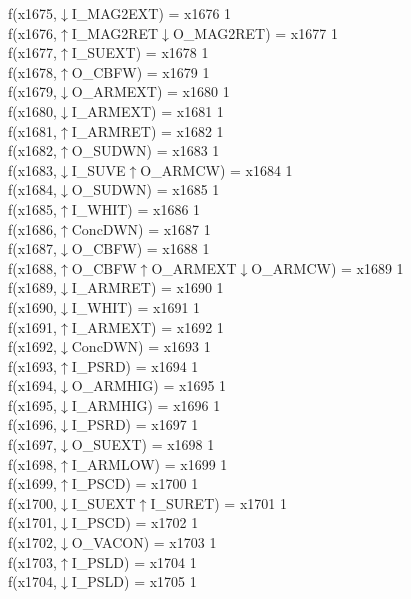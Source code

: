 f(x1675,$\downarrow$I\_MAG2EXT) = x1676 {1} \\
f(x1676,$\uparrow$I\_MAG2RET$\downarrow$O\_MAG2RET) = x1677 {1} \\
f(x1677,$\uparrow$I\_SUEXT) = x1678 {1} \\
f(x1678,$\uparrow$O\_CBFW) = x1679 {1} \\
f(x1679,$\downarrow$O\_ARMEXT) = x1680 {1} \\
f(x1680,$\downarrow$I\_ARMEXT) = x1681 {1} \\
f(x1681,$\uparrow$I\_ARMRET) = x1682 {1} \\
f(x1682,$\uparrow$O\_SUDWN) = x1683 {1} \\
f(x1683,$\downarrow$I\_SUVE$\uparrow$O\_ARMCW) = x1684 {1} \\
f(x1684,$\downarrow$O\_SUDWN) = x1685 {1} \\
f(x1685,$\uparrow$I\_WHIT) = x1686 {1} \\
f(x1686,$\uparrow$ConcDWN) = x1687 {1} \\
f(x1687,$\downarrow$O\_CBFW) = x1688 {1} \\
f(x1688,$\uparrow$O\_CBFW$\uparrow$O\_ARMEXT$\downarrow$O\_ARMCW) = x1689 {1} \\
f(x1689,$\downarrow$I\_ARMRET) = x1690 {1} \\
f(x1690,$\downarrow$I\_WHIT) = x1691 {1} \\
f(x1691,$\uparrow$I\_ARMEXT) = x1692 {1} \\
f(x1692,$\downarrow$ConcDWN) = x1693 {1} \\
f(x1693,$\uparrow$I\_PSRD) = x1694 {1} \\
f(x1694,$\downarrow$O\_ARMHIG) = x1695 {1} \\
f(x1695,$\downarrow$I\_ARMHIG) = x1696 {1} \\
f(x1696,$\downarrow$I\_PSRD) = x1697 {1} \\
f(x1697,$\downarrow$O\_SUEXT) = x1698 {1} \\
f(x1698,$\uparrow$I\_ARMLOW) = x1699 {1} \\
f(x1699,$\uparrow$I\_PSCD) = x1700 {1} \\
f(x1700,$\downarrow$I\_SUEXT$\uparrow$I\_SURET) = x1701 {1} \\
f(x1701,$\downarrow$I\_PSCD) = x1702 {1} \\
f(x1702,$\downarrow$O\_VACON) = x1703 {1} \\
f(x1703,$\uparrow$I\_PSLD) = x1704 {1} \\
f(x1704,$\downarrow$I\_PSLD) = x1705 {1} \\
